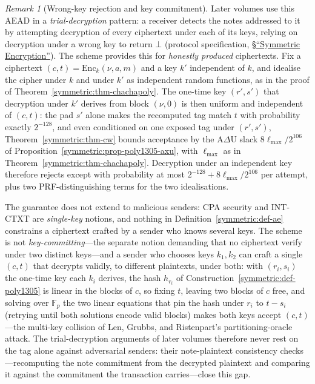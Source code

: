 \documentclass[11pt,a4paper]{article}
\theoremstyle{definition}
\theoremstyle{remark}
\newtheorem{remark}[theorem]{Remark}
\newcommand{\F}{\ensuremath{\mathbb{F}}}
\begin{document}
\begin{remark}[Wrong-key rejection and key commitment]
\label{symmetric:rem-wrong-key}
Later volumes use this AEAD in a \emph{trial-decryption} pattern: a
receiver detects the notes addressed to it by attempting decryption
of every ciphertext under each of its keys, relying on decryption
under a wrong key to return \(\bot\)
(protocol specification,
\href{https://zips.z.cash/protocol/protocol.pdf\#concretesym}{\S``Symmetric Encryption''}). The
scheme provides this for \emph{honestly produced} ciphertexts. Fix a
ciphertext
\((c, t) = \mathrm{Enc}_{k}(\nu, a, m)\) and a key \(k'\)
independent of \(k\), and idealise the cipher under \(k\) and under
\(k'\) as independent random functions, as in the proof of
Theorem~\ref{symmetric:thm-chachapoly}. The one-time key
\((r', s')\) that decryption under \(k'\) derives from block
\((\nu, 0)\) is then uniform and independent of \((c, t)\): the pad
\(s'\) alone makes the recomputed tag match \(t\) with probability
exactly \(2^{-128}\), and even conditioned on one exposed tag under
\((r', s')\), Theorem~\ref{symmetric:thm-cw} bounds acceptance by
the A\(\Delta\)U slack \(8 \ell_{\max}/2^{106}\) of
Proposition~\ref{symmetric:prop-poly1305-axu}, with \(\ell_{\max}\)
as in Theorem~\ref{symmetric:thm-chachapoly}. Decryption under an
independent key therefore rejects except with probability at most
\(2^{-128} + 8 \ell_{\max}/2^{106}\) per attempt, plus two
PRF-distinguishing terms for the two idealisations.

The guarantee does not extend to malicious senders: CPA security and
INT-CTXT are \emph{single-key} notions, and nothing in
Definition~\ref{symmetric:def-ae} constrains a ciphertext crafted by
a sender who knows several keys. The scheme is not
\emph{key-committing}---the separate notion demanding that no
ciphertext verify under two distinct keys---and a sender who chooses
keys \(k_{1}, k_{2}\) can craft a single
\((c, t)\) that decrypts validly, to different plaintexts, under
both: with \((r_{i}, s_{i})\) the one-time key each \(k_{i}\)
derives, the hash \(h_{r_{i}}\) of
Construction~\ref{symmetric:def-poly1305} is linear in the blocks of
\(c\), so fixing \(t\), leaving two blocks of \(c\) free, and
solving over \(\F_{p}\) the two linear equations that pin the hash
under \(r_{i}\) to \(t - s_{i}\) (retrying until both solutions
encode valid blocks) makes both keys accept \((c, t)\)---the
multi-key collision of Len, Grubbs, and Ristenpart's
partitioning-oracle attack. The trial-decryption arguments of later
volumes therefore never rest on the tag alone against adversarial
senders: their note-plaintext consistency checks---recomputing the
note commitment from the decrypted plaintext and comparing it against
the commitment the transaction carries---close this gap.
\end{remark}
\end{document}

